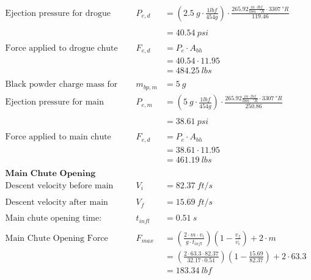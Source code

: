 \documentclass{article}
\begin{document}
\begin{align*}
			\text{Ejection pressure for drogue chute:}& &P_{e,d} &= \left(\SI{2.5}{g} \cdot \frac{1 lbf}{454 g} \right) \cdot \frac{265.92 \frac{in \cdot lbf}{lbm \cdot  \SI{}{\degree R}} \cdot 3307 \SI{}{\degree R}}{119.46} \\ \\
		&& &= \SI{40.54}{psi} \\ \\
		\text{Force applied to drogue chute bay bulkheads:}& &F_{e,d } &= P_{e} \cdot A_{bh} \\
		&& &= 40.54\cdot 11.95\\
		&& &= \SI{484.25}{lbs} \\ \\
		\text{Black powder charge mass for main chute bay:}& &m_{bp,m} &= \SI{5}{g} \\
			\text{Ejection pressure for main chute:}& &P_{e,m} &= \left(\SI{5}{g} \cdot \frac{1 lbf}{454 g} \right) \cdot \frac{265.92 \frac{in \cdot lbf}{lbm \cdot  \SI{}{\degree R}} \cdot 3307 \SI{}{\degree R}}{250.86} \\ \\
		&& &= \SI{38.61}{psi} \\ \\
		\text{Force applied to main chute bay bulkheads:}& &F_{e,d } &= P_{e} \cdot A_{bh} \\
		&& &= 38.61\cdot 11.95\\
		&& &= \SI{461.19}{lbs} \\ \\
		\textbf{Main Chute Opening Force Calculation} \\
		\text{Descent velocity before main chute opening:}& &V_{i} &= \SI{82.37}{ft/s} \\ \\
		\text{Descent velocity after main chute opening:}& &V_{f} &= \SI{15.69}{ft/s} \\ \\
		\text{Main chute opening time:}& &t_{infl} &= \SI{0.51}{s} \\ \\
		\text{Main Chute Opening Force Equation:}& &F_{max} &= \left( \frac{2 \cdot m \cdot v_{i}}{g \cdot t_{infl}} \right) \left( 1 - \frac{v_f}{v_i} \right) + 2 \cdot m \tag{eqn. 16} \\
		&& &= \left( \frac{2 \cdot 63.3 \cdot 82.37}{32.17\cdot 0.51} \right) \left( 1 - \frac{15.69}{82.37} \right) + 2 \cdot63.3\\&& &= \SI{183.34}{lbf} \\
	\end{align*}
\end{document}
